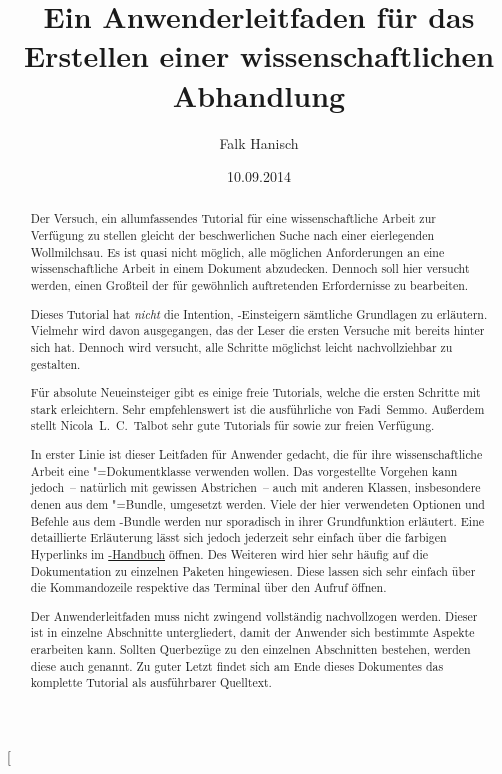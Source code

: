 \documentclass[%
  english,ngerman,%
  geometry=no,DIV=12,automark,%
]{tudscrartcl}
\begin{document}
\title{%
  Ein Anwenderleitfaden für das Erstellen einer wissenschaftlichen Abhandlung%
}
\author{Falk Hanisch}
\date{10.09.2014}
\makeatletter
\begingroup%
  \def\and{, }%
  \let\thanks\@gobble%
  \let\footnote\@gobble%
\endgroup%
\makeatother
\StartTutorial[%
  \begin{abstract}\noindent
  Der Versuch, ein allumfassendes Tutorial für eine wissenschaftliche Arbeit 
  zur Verfügung zu stellen gleicht der beschwerlichen Suche nach einer 
  eierlegenden Wollmilchsau. Es ist quasi nicht möglich, alle möglichen 
  Anforderungen an eine wissenschaftliche Arbeit in einem Dokument abzudecken. 
  Dennoch soll hier versucht werden, einen Großteil der für gewöhnlich 
  auftretenden Erfordernisse zu bearbeiten.
  
  Dieses Tutorial hat \emph{nicht} die Intention, -Einsteigern 
  sämtliche Grundlagen zu erläutern. Vielmehr wird davon ausgegangen, das der 
  Leser die ersten Versuche mit  bereits hinter sich hat. 
  Dennoch wird versucht, alle Schritte möglichst leicht nachvollziehbar zu 
  gestalten.
  
  Für absolute Neueinsteiger gibt es einige freie Tutorials, welche die ersten 
  Schritte mit  stark erleichtern. Sehr empfehlenswert ist die 
  ausführliche  
  von Fadi~Semmo. Außerdem stellt Nicola~L.~C.~Talbot sehr gute Tutorials für 
  sowie  zur 
  freien Verfügung.
  
  In erster Linie ist dieser Leitfaden für Anwender gedacht, die für ihre
  wissenschaftliche Arbeit eine \TUDScript"=Dokumentklasse verwenden wollen. 
  Das vorgestellte Vorgehen kann jedoch~-- natürlich mit gewissen Abstrichen~-- 
  auch mit anderen Klassen, insbesondere denen aus dem \KOMAScript"=Bundle, 
  umgesetzt werden. Viele der hier verwendeten Optionen und Befehle aus dem 
  \TUDScript-Bundle werden nur sporadisch in ihrer Grundfunktion erläutert. 
  Eine detaillierte Erläuterung lässt sich jedoch jederzeit sehr einfach über 
  die farbigen Hyperlinks im \href{run:../tudscr.pdf}{\TUDScript-Handbuch} 
  öffnen. Des Weiteren wird hier sehr häufig auf die Dokumentation zu einzelnen 
  Paketen hingewiesen. Diese lassen sich sehr einfach über die Kommandozeile 
  respektive das Terminal über den Aufruf  öffnen.
  
  Der Anwenderleitfaden muss nicht zwingend vollständig nachvollzogen werden. 
  Dieser ist in einzelne Abschnitte untergliedert, damit der Anwender sich 
  bestimmte Aspekte erarbeiten kann. Sollten Querbezüge zu den einzelnen 
  Abschnitten bestehen, werden diese auch genannt. Zu guter Letzt findet sich 
  am Ende dieses Dokumentes das komplette Tutorial als ausführbarer Quelltext. 
  \end{abstract}
\end{document}
